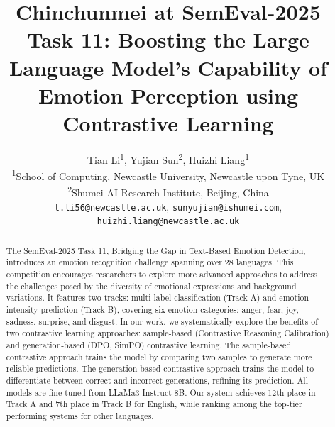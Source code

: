 \documentclass[11pt]{article}
\title{Chinchunmei at SemEval-2025 Task 11: Boosting the Large Language Model's Capability of Emotion Perception using Contrastive Learning}
\author{
  Tian Li\textsuperscript{1},
  Yujian Sun\textsuperscript{2},
  Huizhi Liang\textsuperscript{1}
\\
  \textsuperscript{1}School of Computing, Newcastle University, Newcastle upon Tyne, UK\\
  \textsuperscript{2}Shumei AI Research Institute, Beijing, China
\\
  \texttt{t.li56@newcastle.ac.uk}, \texttt{sunyujian@ishumei.com},\\\texttt{huizhi.liang@newcastle.ac.uk}
}
\begin{document}
\maketitle
\begin{abstract}

The SemEval-2025 Task 11, Bridging the Gap in Text-Based Emotion Detection, introduces an emotion recognition challenge spanning over 28 languages. This competition encourages researchers to explore more advanced approaches to address the challenges posed by the diversity of emotional expressions and background variations. It features two tracks: multi-label classification (Track A) and emotion intensity prediction (Track B), covering six emotion categories: anger, fear, joy, sadness, surprise, and disgust.
In our work, we systematically explore the benefits of two contrastive learning approaches: sample-based (Contrastive Reasoning Calibration) and generation-based (DPO, SimPO) contrastive learning. The sample-based contrastive approach trains the model by comparing two samples to generate more reliable predictions. The generation-based contrastive approach trains the model to differentiate between correct and incorrect generations, refining its prediction. All models are fine-tuned from LLaMa3-Instruct-8B. Our system achieves 12th place in Track A and 7th place in Track B for English, while ranking among the top-tier performing systems for other languages.

\end{abstract}
\end{document}
